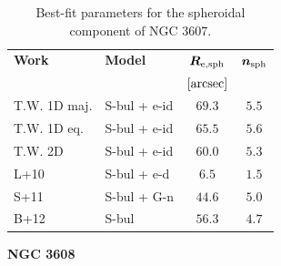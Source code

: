 \documentclass[preprint2]{emulateapj}
\begin{document}
  \begin{table}[h]
  \small
  \caption{Best-fit parameters for the spheroidal component of NGC 3607.}
  \begin{center}
  \begin{tabular}{llcc}
  \hline
  {\bf Work} & {\bf Model}   & $\bm R_{\rm e,sph}$    & $\bm n_{\rm sph}$ \\
    &  &  $[\rm arcsec]$ & \\
  \hline
  T.W. 1D maj. & S-bul + e-id & $69.3$  &  $5.5$ \\
  T.W. 1D eq.  & S-bul + e-id & $65.5$  &  $5.6$ \\
  T.W. 2D      & S-bul + e-id & $60.0$  &  $5.3$ \\
  \hline
  L+10	   & S-bul + e-d      & $6.5$   &  $1.5$ \\
  S+11	   & S-bul + G-n      & $44.6$  &  $5.0$ \\
  B+12	   & S-bul	      & $56.3$  &  $4.7$ \\
  \hline
  \end{tabular}
  \end{center}
  \label{tab:n3607}
  \end{table}

  \clearpage\newpage\noindent

  {\bf NGC 3608 \\}
\end{document}

